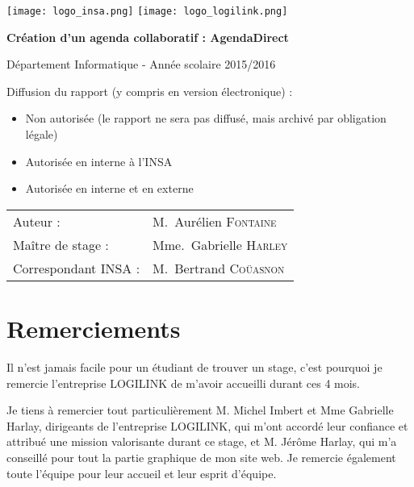 \documentclass[a4paper, 11pt]{report}
\begin{document}
\renewcommand{\bibname}{Références}

\begin{titlepage}
    \texttt{[image: logo\_insa.png]}
    \hspace{0.35\textwidth}
    \texttt{[image: logo\_logilink.png]}
    \begin{center}
        \vspace{7cm}
        {\huge\bfseries Création d'un agenda collaboratif : AgendaDirect \par}
        \vspace{0.5cm}
        {\Large Département Informatique - Année scolaire 2015/2016\par}
    \end{center}
    \vfill

    Diffusion du rapport (y compris en version électronique) :

    \begin{itemize}[label=$\square$]
        \item Non autorisée (le rapport ne sera pas diffusé, mais archivé par obligation légale)
        \item Autorisée en interne à l’INSA
        \item Autorisée en interne et en externe
    \end{itemize}

    \vspace{0.5cm}

    \begin{tabular}{ll}
        {\Large Auteur :}             & M.~Aurélien \textsc{Fontaine}\\
        {\Large Maître de stage :}    & Mme.~Gabrielle \textsc{Harley}\\
        {\Large Correspondant INSA :} & M.~Bertrand \textsc{Coüasnon}\\
    \end{tabular}
\end{titlepage}

\chapter*{Remerciements}

Il n'est jamais facile pour un étudiant de trouver un stage, c'est pourquoi je remercie l'entreprise LOGILINK de m'avoir accueilli durant ces 4 mois.

Je tiens à remercier tout particulièrement M. Michel Imbert et Mme Gabrielle Harlay, dirigeants de l'entreprise LOGILINK,  qui m'ont accordé leur confiance et attribué une mission valorisante durant ce stage, et M. Jérôme Harlay, qui m'a conseillé pour tout la partie graphique de mon site web. Je remercie également toute l'équipe pour leur accueil et leur esprit d'équipe.
\end{document}

